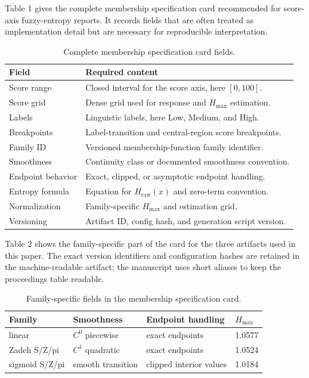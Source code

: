 \documentclass[a4paper,10pt,twocolumn]{myjarticle2}
\newcommand{\Hraw}{H_{\mathrm{raw}}}
\begin{document}
Table 1 gives the complete membership specification card recommended for
score-axis fuzzy-entropy reports. It records fields that are often treated as
implementation detail but are necessary for reproducible interpretation.

\begin{table}
\centering
\caption{Complete membership specification card fields.}
\label{tab:complete-card}
\footnotesize
\setlength{\tabcolsep}{2pt}
\begin{tabular}{|p{23mm}|p{46mm}|}
\hline
Field & Required content \\
\hline
Score range & Closed interval for the score axis, here $[0,100]$. \\
\hline
Score grid & Dense grid used for response and $H_{\max}$ estimation. \\
\hline
Labels & Linguistic labels, here Low, Medium, and High. \\
\hline
Breakpoints & Label-transition and central-region score breakpoints. \\
\hline
Family ID & Versioned membership-function family identifier. \\
\hline
Smoothness & Continuity class or documented smoothness convention. \\
\hline
Endpoint behavior & Exact, clipped, or asymptotic endpoint handling. \\
\hline
Entropy formula & Equation for $\Hraw(x)$ and zero-term convention. \\
\hline
Normalization & Family-specific $H_{\max}$ and estimation grid. \\
\hline
Versioning & Artifact ID, config hash, and generation script version. \\
\hline
\end{tabular}
\end{table}

Table 2 shows the family-specific part of the card for the three artifacts used
in this paper. The exact version identifiers and configuration hashes are
retained in the machine-readable artifact; the manuscript uses short aliases to
keep the proceedings table readable.

\begin{table}
\centering
\caption{Family-specific fields in the membership specification card.}
\label{tab:family-card}
\footnotesize
\setlength{\tabcolsep}{2pt}
\begin{tabular}{|p{18mm}|p{16mm}|p{20mm}|p{10mm}|}
\hline
Family & Smoothness & Endpoint handling & $H_{\max}$ \\
\hline
linear & $C^0$ piecewise & exact endpoints & 1.0577 \\
\hline
Zadeh S/Z/pi & $C^1$ quadratic & exact endpoints & 1.0524 \\
\hline
sigmoid S/Z/pi & smooth transition & clipped interior values & 1.0184 \\
\hline
\end{tabular}
\end{table}
\end{document}
